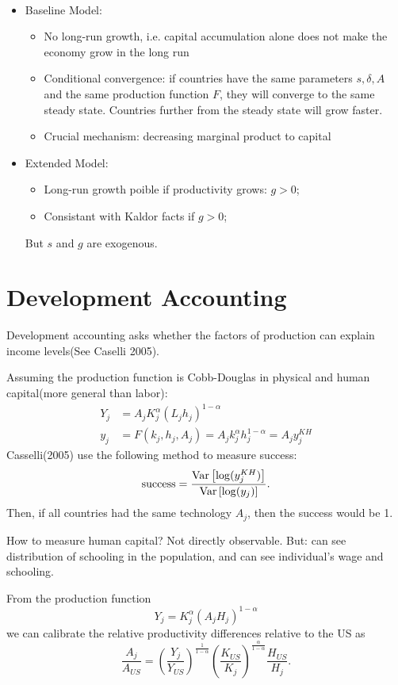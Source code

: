 \begin{summary}
    \

    \begin{itemize}
        \item Baseline Model: 
            \begin{itemize}
                \item No long-run growth, i.e. capital accumulation alone does not make
                the economy grow in the long run
                \item Conditional convergence: if countries have the same parameters $s, \delta, A$
                and the same production function $F$, they will converge to the same
                steady state. Countries further from the steady state will grow faster.
                \item Crucial mechanism: decreasing marginal product to capital
            \end{itemize}
        \item Extended Model:
            \begin{itemize}
                \item Long-run growth poible if productivity grows: $g>0$;
                \item Consistant with Kaldor facts if $g>0$;
            \end{itemize}
        But $s$ and $g$ are exogenous.
    \end{itemize}
\end{summary}

\section{Development Accounting}
Development accounting asks whether the factors of production can explain income levels(See Caselli 2005\cite{caselli2005accounting}).

Assuming the production function is Cobb-Douglas in physical and human capital(more general than labor):
\begin{align*}
    Y_j &= A_j K_j^{\alpha} (L_j h_j)^{1-\alpha}\\
    y_j &= F(k_j, h_j, A_j) = A_j k_j^{\alpha} h_j^{1-\alpha} = A_j y_j^{KH} 
\end{align*}
Casselli(2005) use the following method to measure success:
\[\text{success} = \frac{\operatorname{Var}\left[ \log(y_j^{KH} )\right] }{\operatorname{Var}\left[\log(y_j)\right]}.\]
Then, if all countries had the same technology $A_j$, then the success would be 1.

How to measure human capital? Not directly observable. But: can
see distribution of schooling in the population, and can see
individual's wage and schooling.

From the production function
\[Y_j = K_j^{\alpha} (A_j H_j)^{1-\alpha}\]
we can calibrate the relative productivity differences relative to the US as
\[\frac{A_j}{A_{US}} = \left(\frac{Y_j}{Y_{US}}\right)^{\frac{1}{1-\alpha}} \left(\frac{K_{US}}{K_{j}}\right)^{\frac{\alpha}{1-\alpha}} \frac{H_{US}}{H_j}.\]
